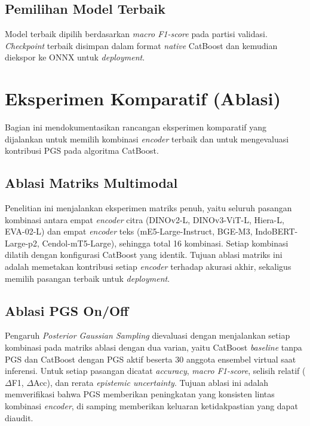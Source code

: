 \subsection{Pemilihan Model Terbaik}

Model terbaik dipilih berdasarkan \textit{macro F1-score} pada partisi validasi. \textit{Checkpoint} terbaik disimpan dalam format \textit{native} CatBoost dan kemudian diekspor ke ONNX untuk \textit{deployment}.

\section{Eksperimen Komparatif (Ablasi)}
\label{sec:eksperimen}

Bagian ini mendokumentasikan rancangan eksperimen komparatif yang dijalankan untuk memilih kombinasi \textit{encoder} terbaik dan untuk mengevaluasi kontribusi PGS pada algoritma CatBoost.

\subsection{Ablasi Matriks Multimodal}

Penelitian ini menjalankan eksperimen matriks penuh, yaitu seluruh pasangan kombinasi antara empat \textit{encoder} citra (DINOv2-L, DINOv3-ViT-L, Hiera-L, EVA-02-L) dan empat \textit{encoder} teks (mE5-Large-Instruct, BGE-M3, IndoBERT-Large-p2, Cendol-mT5-Large), sehingga total 16 kombinasi. Setiap kombinasi dilatih dengan konfigurasi CatBoost yang identik. Tujuan ablasi matriks ini adalah memetakan kontribusi setiap \textit{encoder} terhadap akurasi akhir, sekaligus memilih pasangan terbaik untuk \textit{deployment}.

\subsection{Ablasi PGS On/Off}

Pengaruh \textit{Posterior Gaussian Sampling} dievaluasi dengan menjalankan setiap kombinasi pada matriks ablasi dengan dua varian, yaitu CatBoost \textit{baseline} tanpa PGS dan CatBoost dengan PGS aktif beserta 30 anggota ensembel virtual saat inferensi. Untuk setiap pasangan dicatat \textit{accuracy}, \textit{macro F1-score}, selisih relatif ($\Delta$F1, $\Delta$Acc), dan rerata \textit{epistemic uncertainty}. Tujuan ablasi ini adalah memverifikasi bahwa PGS memberikan peningkatan yang konsisten lintas kombinasi \textit{encoder}, di samping memberikan keluaran ketidakpastian yang dapat diaudit.

